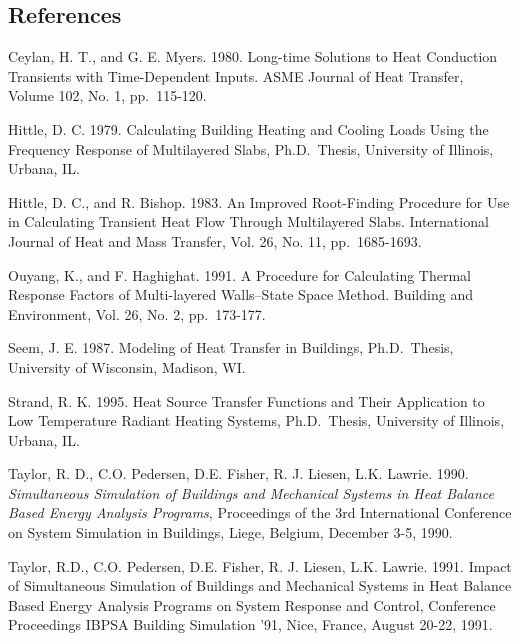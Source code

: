 \subsection{References}\label{references-014}

Ceylan, H. T., and G. E. Myers. 1980. Long-time Solutions to Heat Conduction Transients with Time-Dependent Inputs. ASME Journal of Heat Transfer, Volume 102, No. 1, pp.~115-120.

Hittle, D. C. 1979. Calculating Building Heating and Cooling Loads Using the Frequency Response of Multilayered Slabs, Ph.D.~Thesis, University of Illinois, Urbana, IL.

Hittle, D. C., and R. Bishop. 1983. An Improved Root-Finding Procedure for Use in Calculating Transient Heat Flow Through Multilayered Slabs. International Journal of Heat and Mass Transfer, Vol. 26, No. 11, pp.~1685-1693.

Ouyang, K., and F. Haghighat. 1991. A Procedure for Calculating Thermal Response Factors of Multi-layered Walls--State Space Method. Building and Environment, Vol. 26, No. 2, pp.~173-177.

Seem, J. E. 1987. Modeling of Heat Transfer in Buildings, Ph.D.~Thesis, University of Wisconsin, Madison, WI.

Strand, R. K. 1995. Heat Source Transfer Functions and Their Application to Low Temperature Radiant Heating Systems, Ph.D.~Thesis, University of Illinois, Urbana, IL.

Taylor, R. D., C.O. Pedersen, D.E. Fisher, R. J. Liesen, L.K. Lawrie. 1990. \emph{Simultaneous Simulation of Buildings and Mechanical Systems in Heat Balance Based Energy Analysis Programs}, Proceedings of the 3rd International Conference on System Simulation in Buildings, Liege, Belgium, December 3-5, 1990.

Taylor, R.D., C.O. Pedersen, D.E. Fisher, R. J. Liesen, L.K. Lawrie. 1991. Impact of Simultaneous Simulation of Buildings and Mechanical Systems in Heat Balance Based Energy Analysis Programs on System Response and Control, Conference Proceedings IBPSA Building Simulation '91, Nice, France, August 20-22, 1991.
